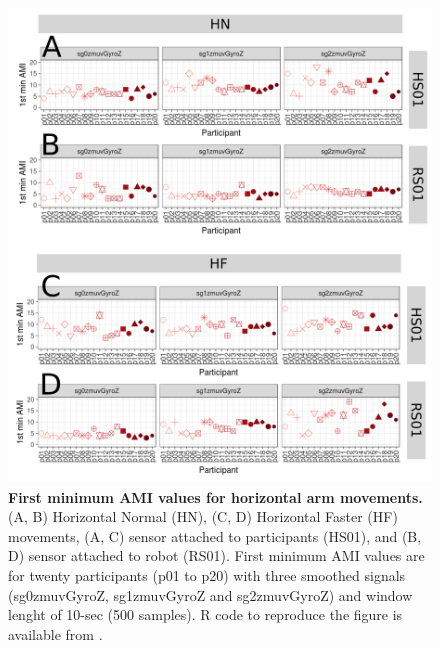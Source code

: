 \begin{figure}[!h]
\centering
\includegraphics[width=1.0\textwidth]{ami_aHw10}
	\caption{
	{\bf First minimum AMI values for horizontal arm movements.}
		(A, B) Horizontal Normal (HN), (C, D) Horizontal Faster (HF) 
		movements,
		(A, C) sensor attached to participants (HS01), and
		(B, D) sensor attached to robot (RS01).
		First minimum AMI values are for twenty participants 
		(p01 to p20) with three smoothed signals (sg0zmuvGyroZ, 
		sg1zmuvGyroZ and sg2zmuvGyroZ) and  window lenght of 
		10-sec (500 samples).
		R code to reproduce the figure is available 
		from \cite{hwum2018}.
        }
    \label{fig:amiH}
\end{figure}
